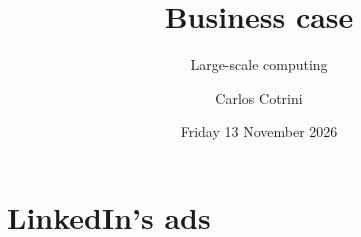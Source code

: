 \documentclass[aspectratio=169]{beamer}
\title{Business case}
\subtitle{Large-scale computing}
\author{Carlos Cotrini}
\institute{AI in Industry, ETH Zurich}
\date{Friday 13 November 2026}
\begin{document}
\begin{frame}
  \titlepage
\end{frame}
\section{LinkedIn's ads}

\end{document}
